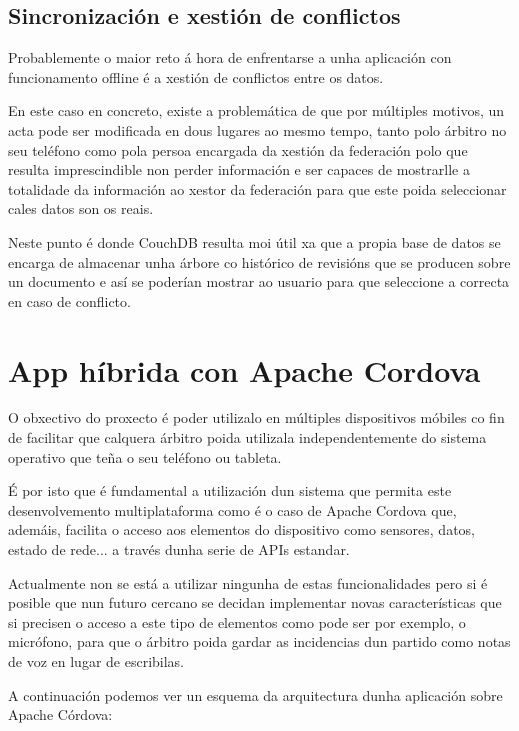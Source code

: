     \subsection{Sincronización e xestión de conflictos}
    Probablemente o maior reto á hora de enfrentarse a unha aplicación con 
funcionamento offline é a xestión de conflictos entre os datos.

    En este caso en concreto, existe a problemática de que por múltiples 
motivos, un acta pode ser modificada en dous lugares ao mesmo tempo, tanto polo 
árbitro no seu teléfono como pola persoa encargada da xestión da federación
polo que resulta imprescindible non perder información e ser capaces de 
mostrarlle a totalidade da información ao xestor da federación para que este 
poida seleccionar cales datos son os reais.

    Neste punto é donde CouchDB resulta moi útil xa que a propia base de datos 
se encarga de almacenar unha árbore co histórico de revisións que se producen 
sobre un documento e así se poderían mostrar ao usuario para que seleccione a 
correcta en caso de conflicto.

  \section{App híbrida con Apache Cordova}
  O obxectivo do proxecto é poder utilizalo en múltiples dispositivos móbiles 
co fin de facilitar que calquera árbitro poida utilizala independentemente do 
sistema operativo que teña o seu teléfono ou tableta.

  É por isto que é fundamental a utilización dun sistema que permita este 
desenvolvemento multiplataforma como é o caso de Apache Cordova que, ademáis, 
facilita o acceso aos elementos do dispositivo como sensores, datos, estado de 
rede... a través dunha serie de APIs estandar.

  Actualmente non se está a utilizar ningunha de estas funcionalidades pero si 
é posible que nun futuro cercano se decidan implementar novas características 
que si precisen o acceso a este tipo de elementos como pode ser por exemplo, o 
micrófono, para que o árbitro poida gardar as incidencias dun partido como 
notas de voz en lugar de escribilas.

  A continuación podemos ver un esquema da arquitectura dunha aplicación 
sobre Apache Córdova:

